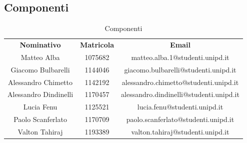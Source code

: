 \newpage

\subsection{Componenti}
	\begin{table} [h!]
		\begin{center}
			\renewcommand{\arraystretch}{3}
			\begin{tabular} { c c c }
				\rowcolor{lightgray}
				\textbf{Nominativo} & \textbf{Matricola} & \textbf{Email} \\
				Matteo Alba & 1075682 & matteo.alba.1@studenti.unipd.it\\
				Giacomo Bulbarelli & 1144046 & giacomo.bulbarelli@studenti.unipd.it\\
				Alessandro Chimetto & 1142192 & alessandro.chimetto@studenti.unipd.it\\
				Alessandro Dindinelli & 1170457 & alessandro.dindinelli@studenti.unipd.it\\
				Lucia Fenu & 1125521 & lucia.fenu@studenti.unipd.it\\
				Paolo Scanferlato & 1170709 & paolo.scanferlato@studenti.unipd.it\\
				Valton Tahiraj & 1193389 & valton.tahiraj@studenti.unipd.it\\
			\end{tabular}
			\caption{Componenti}
		\end{center}
	\end{table}
	






